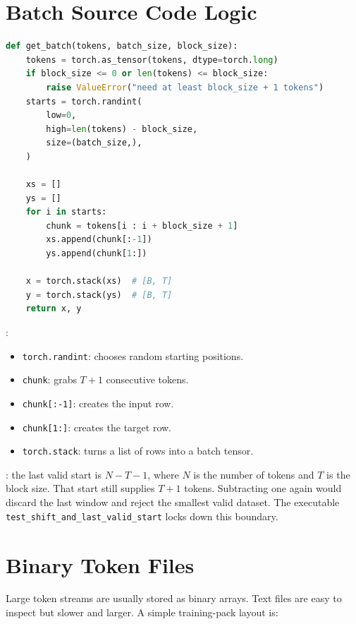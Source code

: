 \section{Batch Source Code Logic}

\begin{lstlisting}[language=Python]
def get_batch(tokens, batch_size, block_size):
    tokens = torch.as_tensor(tokens, dtype=torch.long)
    if block_size <= 0 or len(tokens) <= block_size:
        raise ValueError("need at least block_size + 1 tokens")
    starts = torch.randint(
        low=0,
        high=len(tokens) - block_size,
        size=(batch_size,),
    )

    xs = []
    ys = []
    for i in starts:
        chunk = tokens[i : i + block_size + 1]
        xs.append(chunk[:-1])
        ys.append(chunk[1:])

    x = torch.stack(xs)  # [B, T]
    y = torch.stack(ys)  # [B, T]
    return x, y
\end{lstlisting}

:

\begin{itemize}
  \item \texttt{torch.randint}: chooses random starting positions.
  \item \texttt{chunk}: grabs \(T+1\) consecutive tokens.
  \item \texttt{chunk[:-1]}: creates the input row.
  \item \texttt{chunk[1:]}: creates the target row.
  \item \texttt{torch.stack}: turns a list of rows into a batch tensor.
\end{itemize}

: the last valid start is
\(N-T-1\), where \(N\) is the number of tokens and \(T\) is the block size.
That start still supplies \(T+1\) tokens. Subtracting one again would discard
the last window and reject the smallest valid dataset. The executable
\texttt{test\_shift\_and\_last\_valid\_start} locks down this boundary.

\section{Binary Token Files}

Large token streams are usually stored as binary arrays. Text files are easy to inspect but slower and larger. A simple training-pack layout is:

